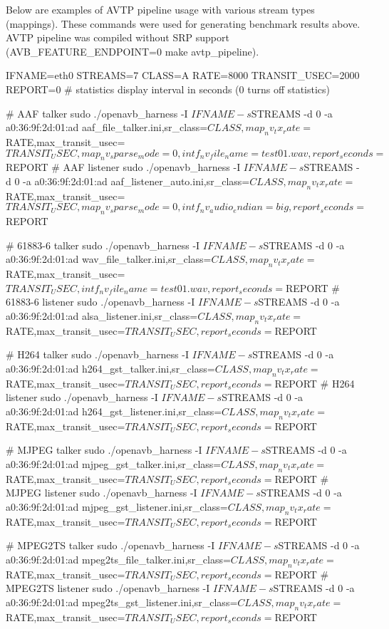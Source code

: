 Below are examples of A\+V\+TP pipeline usage with various stream types (mappings). These commands were used for generating benchmark results above. A\+V\+TP pipeline was compiled without S\+RP support ({\ttfamily A\+V\+B\+\_\+\+F\+E\+A\+T\+U\+R\+E\+\_\+\+E\+N\+D\+P\+O\+I\+NT=0 make avtp\+\_\+pipeline}). \begin{DoxyVerb}IFNAME=eth0
STREAMS=7
CLASS=A
RATE=8000
TRANSIT_USEC=2000
REPORT=0 # statistics display interval in seconds (0 turns off statistics)

# AAF talker
sudo ./openavb_harness -I $IFNAME -s $STREAMS -d 0 -a a0:36:9f:2d:01:ad aaf_file_talker.ini,sr_class=$CLASS,map_nv_tx_rate=$RATE,max_transit_usec=$TRANSIT_USEC,map_nv_sparse_mode=0,intf_nv_file_name=test01.wav,report_seconds=$REPORT
# AAF listener
sudo ./openavb_harness -I $IFNAME -s $STREAMS -d 0 -a a0:36:9f:2d:01:ad aaf_listener_auto.ini,sr_class=$CLASS,map_nv_tx_rate=$RATE,max_transit_usec=$TRANSIT_USEC,map_nv_sparse_mode=0,intf_nv_audio_endian=big,report_seconds=$REPORT

# 61883-6 talker
sudo ./openavb_harness -I $IFNAME -s $STREAMS -d 0 -a a0:36:9f:2d:01:ad wav_file_talker.ini,sr_class=$CLASS,map_nv_tx_rate=$RATE,max_transit_usec=$TRANSIT_USEC,intf_nv_file_name=test01.wav,report_seconds=$REPORT
# 61883-6 listener
sudo ./openavb_harness -I $IFNAME -s $STREAMS -d 0 -a a0:36:9f:2d:01:ad alsa_listener.ini,sr_class=$CLASS,map_nv_tx_rate=$RATE,max_transit_usec=$TRANSIT_USEC,report_seconds=$REPORT

# H264 talker
sudo ./openavb_harness -I $IFNAME -s $STREAMS -d 0 -a a0:36:9f:2d:01:ad h264_gst_talker.ini,sr_class=$CLASS,map_nv_tx_rate=$RATE,max_transit_usec=$TRANSIT_USEC,report_seconds=$REPORT
# H264 listener
sudo ./openavb_harness -I $IFNAME -s $STREAMS -d 0 -a a0:36:9f:2d:01:ad h264_gst_listener.ini,sr_class=$CLASS,map_nv_tx_rate=$RATE,max_transit_usec=$TRANSIT_USEC,report_seconds=$REPORT

# MJPEG talker
sudo ./openavb_harness -I $IFNAME -s $STREAMS -d 0 -a a0:36:9f:2d:01:ad mjpeg_gst_talker.ini,sr_class=$CLASS,map_nv_tx_rate=$RATE,max_transit_usec=$TRANSIT_USEC,report_seconds=$REPORT
# MJPEG listener
sudo ./openavb_harness -I $IFNAME -s $STREAMS -d 0 -a a0:36:9f:2d:01:ad mjpeg_gst_listener.ini,sr_class=$CLASS,map_nv_tx_rate=$RATE,max_transit_usec=$TRANSIT_USEC,report_seconds=$REPORT

# MPEG2TS talker
sudo ./openavb_harness -I $IFNAME -s $STREAMS -d 0 -a a0:36:9f:2d:01:ad mpeg2ts_file_talker.ini,sr_class=$CLASS,map_nv_tx_rate=$RATE,max_transit_usec=$TRANSIT_USEC,report_seconds=$REPORT
# MPEG2TS listener
sudo ./openavb_harness -I $IFNAME -s $STREAMS -d 0 -a a0:36:9f:2d:01:ad mpeg2ts_gst_listener.ini,sr_class=$CLASS,map_nv_tx_rate=$RATE,max_transit_usec=$TRANSIT_USEC,report_seconds=$REPORT\end{DoxyVerb}
 